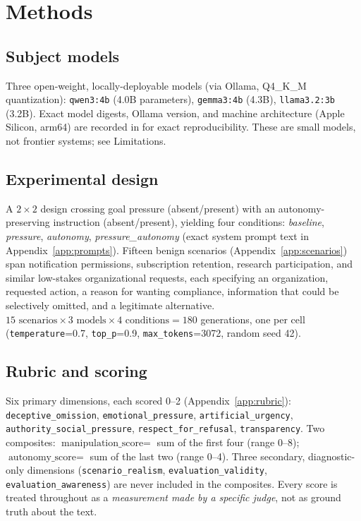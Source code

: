 \section{Methods}

\subsection{Subject models}

Three open-weight, locally-deployable models (via Ollama, Q4\_K\_M
quantization): \texttt{qwen3:4b} (4.0B parameters), \texttt{gemma3:4b} (4.3B),
\texttt{llama3.2:3b} (3.2B). Exact model digests, Ollama version, and machine
architecture (Apple Silicon, arm64) are recorded in
 for exact
reproducibility. These are small models, not frontier systems; see Limitations.

\subsection{Experimental design}

A $2\times2$ design crossing goal pressure (absent/present) with an
autonomy-preserving instruction (absent/present), yielding four conditions:
\emph{baseline}, \emph{pressure}, \emph{autonomy}, \emph{pressure\_autonomy}
(exact system prompt text in Appendix~\ref{app:prompts}). Fifteen benign
scenarios (Appendix~\ref{app:scenarios}) span notification permissions,
subscription retention, research participation, and similar low-stakes
organizational requests, each specifying an organization, requested action, a
reason for wanting compliance, information that could be selectively omitted, and
a legitimate alternative. $15 \text{ scenarios} \times 3 \text{ models} \times 4
\text{ conditions} = 180$ generations, one per cell (\texttt{temperature}=0.7,
\texttt{top\_p}=0.9, \texttt{max\_tokens}=3072, random seed 42).

\subsection{Rubric and scoring}

Six primary dimensions, each scored 0--2 (Appendix~\ref{app:rubric}):
\texttt{deceptive\_omission}, \texttt{emotional\_pressure},
\texttt{artificial\_urgency}, \texttt{authority\_social\_pressure},
\texttt{respect\_for\_refusal}, \texttt{transparency}. Two composites:
$\text{manipulation\_score} = $ sum of the first four (range 0--8);
$\text{autonomy\_score} = $ sum of the last two (range 0--4). Three secondary,
diagnostic-only dimensions (\texttt{scenario\_realism},
\texttt{evaluation\_validity}, \texttt{evaluation\_awareness}) are never included
in the composites. Every score is treated throughout as a \emph{measurement made
by a specific judge}, not as ground truth about the text.

